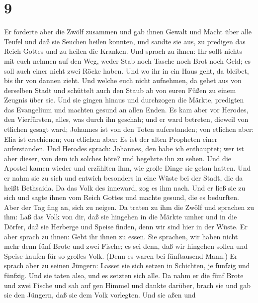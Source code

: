 \hypertarget{section-8}{%
\section{9}\label{section-8}}

 Er forderte aber die Zwölf zusammen und gab ihnen Gewalt
und Macht über alle Teufel und daß sie Seuchen heilen konnten,
 und sandte sie aus, zu predigen das Reich Gottes und zu
heilen die Kranken.  Und sprach zu ihnen: Ihr sollt nichts
mit euch nehmen auf den Weg, weder Stab noch Tasche noch Brot noch Geld;
es soll auch einer nicht zwei Röcke haben.  Und wo ihr in
ein Haus geht, da bleibet, bis ihr von dannen zieht.  Und
welche euch nicht aufnehmen, da gehet aus von derselben Stadt und
schüttelt auch den Staub ab von euren Füßen zu einem Zeugnis über sie.
 Und sie gingen hinaus und durchzogen die Märkte, predigten
das Evangelium und machten gesund an allen Enden.  Es kam
aber vor Herodes, den Vierfürsten, alles, was durch ihn geschah; und er
ward betreten, dieweil von etlichen gesagt ward; Johannes ist von den
Toten auferstanden;  von etlichen aber: Elia ist erschienen;
von etlichen aber: Es ist der alten Propheten einer auferstanden.
 Und Herodes sprach: Johannes, den habe ich enthauptet; wer
ist aber dieser, von dem ich solches höre? und begehrte ihn zu sehen.
 Und die Apostel kamen wieder und erzählten ihm, wie große
Dinge sie getan hatten. Und er nahm sie zu sich und entwich besonders in
eine Wüste bei der Stadt, die da heißt Bethsaida.  Da das
Volk des inneward, zog es ihm nach. Und er ließ sie zu sich und sagte
ihnen vom Reich Gottes und machte gesund, die es bedurften. Aber der Tag
fing an, sich zu neigen.  Da traten zu ihm die Zwölf und
sprachen zu ihm: Laß das Volk von dir, daß sie hingehen in die Märkte
umher und in die Dörfer, daß sie Herberge und Speise finden, denn wir
sind hier in der Wüste.  Er aber sprach zu ihnen: Gebt ihr
ihnen zu essen. Sie sprachen, wir haben nicht mehr denn fünf Brote und
zwei Fische; es sei denn, daß wir hingehen sollen und Speise kaufen für
so großes Volk.  (Denn es waren bei fünftausend Mann.) Er
sprach aber zu seinen Jüngern: Lasset sie sich setzen in Schichten, je
fünfzig und fünfzig.  Und sie taten also, und es setzten
sich alle.  Da nahm er die fünf Brote und zwei Fische und
sah auf gen Himmel und dankte darüber, brach sie und gab sie den
Jüngern, daß sie dem Volk vorlegten.  Und sie aßen und
